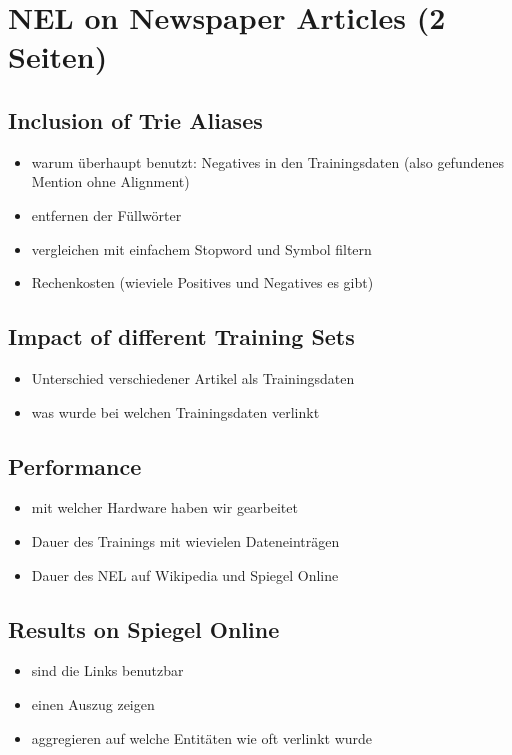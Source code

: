 \section{NEL on Newspaper Articles (2 Seiten)}
\label{sec:NELEval}
	\subsection{Inclusion of Trie Aliases}
	\begin{itemize}
		\item warum überhaupt benutzt: Negatives in den Trainingsdaten (also gefundenes Mention ohne Alignment)
		\item entfernen der Füllwörter
		\item vergleichen mit einfachem Stopword und Symbol filtern
		\item Rechenkosten (wieviele Positives und Negatives es gibt)
	\end{itemize}
	\subsection{Impact of different Training Sets}
	\begin{itemize}
		\item Unterschied verschiedener Artikel als Trainingsdaten
		\item was wurde bei welchen Trainingsdaten verlinkt
	\end{itemize}
	\subsection{Performance}
	\begin{itemize}
		\item mit welcher Hardware haben wir gearbeitet
		\item Dauer des Trainings mit wievielen Dateneinträgen
		\item Dauer des NEL auf Wikipedia und Spiegel Online
	\end{itemize}
	\subsection{Results on Spiegel Online}
	\begin{itemize}
		\item sind die Links benutzbar
		\item einen Auszug zeigen
		\item aggregieren auf welche Entitäten wie oft verlinkt wurde
	\end{itemize}
	